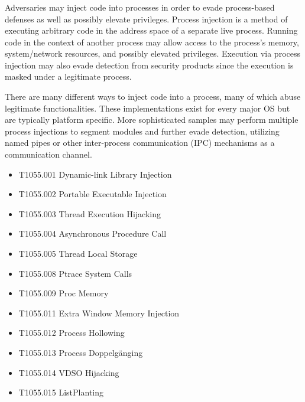 \documentclass{article}
\begin{document}
\subsubsection{}
\textcite{Mitre:2017}

Adversaries may inject code into processes in order to evade process-based defenses as well as possibly elevate privileges. Process injection is a method of executing arbitrary code in the address space of a separate live process. Running code in the context of another process may allow access to the process's memory, system/network resources, and possibly elevated privileges. Execution via process injection may also evade detection from security products since the execution is masked under a legitimate process. 

There are many different ways to inject code into a process, many of which abuse legitimate functionalities. These implementations exist for every major OS but are typically platform specific. 
More sophisticated samples may perform multiple process injections to segment modules and further evade detection, utilizing named pipes or other inter-process communication (IPC) mechanisms as a communication channel. 



\textcite{Oosthoek:2019}


\begin{itemize}
\item T1055.001	Dynamic-link Library Injection
\item T1055.002	Portable Executable Injection
\item T1055.003	Thread Execution Hijacking
\item T1055.004	Asynchronous Procedure Call
\item T1055.005	Thread Local Storage
\item T1055.008	Ptrace System Calls
\item T1055.009	Proc Memory
\item T1055.011	Extra Window Memory Injection
\item T1055.012	Process Hollowing
\item T1055.013	Process Doppelgänging
\item T1055.014	VDSO Hijacking
\item T1055.015	ListPlanting
\end{itemize}
\end{document}
